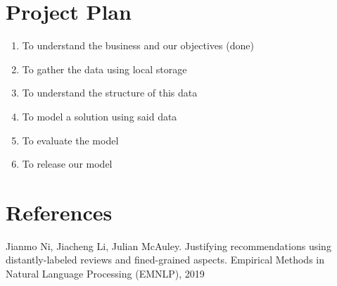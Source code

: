\documentclass{article}
\begin{document}
\section*{Project Plan}

\begin{enumerate}
    \item To understand the business and our objectives (done)
    \item To gather the data using local storage
    \item To understand the structure of this data
    \item To model a solution using said data
    \item To evaluate the model
    \item To release our model
\end{enumerate}

\section*{References}
Jianmo Ni, Jiacheng Li, Julian McAuley. Justifying recommendations using distantly-labeled reviews and fined-grained aspects. Empirical Methods in Natural Language Processing (EMNLP), 2019
\end{document}
